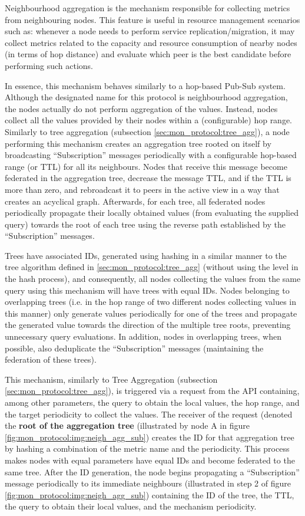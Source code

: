 Neighbourhood aggregation is the mechanism responsible for collecting metrics from neighbouring nodes. This feature is useful in resource management scenarios such as: whenever a node needs to perform service replication/migration, it may collect metrics related to the capacity and resource consumption of nearby nodes (in terms of hop distance) and evaluate which peer is the best candidate before performing such actions. 

In essence, this mechanism behaves similarly to a hop-based Pub-Sub system. Although the designated name for this protocol is neighbourhood aggregation, the nodes actually do not perform aggregation of the values. Instead, nodes collect all the values provided by their nodes within a (configurable) hop range. Similarly to tree aggregation (subsection \ref{sec:mon_protocol:tree_agg}), a node performing this mechanism creates an aggregation tree rooted on itself by broadcasting ``Subscription'' messages periodically with a configurable hop-based range (or TTL) for all its neighbours. Nodes that receive this message become federated in the aggregation tree, decrease the message TTL, and if the TTL is more than zero, and rebroadcast it to peers in the active view in a way that creates an acyclical graph. Afterwards, for each tree, all federated nodes periodically propagate their locally obtained values (from evaluating the supplied query) towards the root of each tree using the reverse path established by the ``Subscription'' messages. 

Trees have associated IDs, generated using hashing in a similar manner to the tree algorithm defined in \ref{sec:mon_protocol:tree_agg} (without using the level in the hash process), and consequently, all nodes collecting the values from the same query using this mechanism will have trees with equal IDs. Nodes belonging to overlapping trees (i.e. in the hop range of two different nodes collecting values in this manner) only generate values periodically for one of the trees and propagate the generated value towards the direction of the multiple tree roots, preventing unnecessary query evaluations. In addition, nodes in overlapping trees, when possible, also deduplicate the ``Subscription'' messages (maintaining the federation of these trees).

This mechanism, similarly to Tree Aggregation (subsection \ref{sec:mon_protocol:tree_agg}), is triggered via a request from the API containing, among other parameters, the query to obtain the local values, the hop range, and the target periodicity to collect the values. The receiver of the request (denoted the \textbf{root of the aggregation tree} (illustrated by node A in figure \ref{fig:mon_protocol:img:neigh_agg_sub}) creates the ID for that aggregation tree by hashing a combination of the metric name and the periodicity. This process makes nodes with equal parameters have equal IDs and become federated to the same tree. After the ID generation, the node begins propagating a ``Subscription'' message periodically to its immediate neighbours (illustrated in step 2 of figure \ref{fig:mon_protocol:img:neigh_agg_sub}) containing the ID of the tree, the TTL, the query to obtain their local values, and the mechanism periodicity. 

